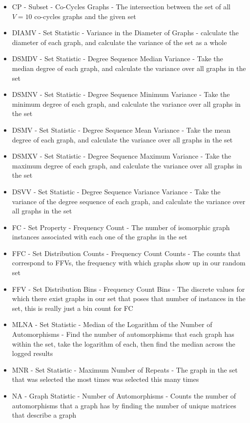 \begin{itemize}
\item{CP - Subset - Co-Cycles Graphs - The intersection between the set of all $V=10$ co-cycles graphs and the given set}
\item{DIAMV - Set Statistic - Variance in the Diameter of Graphs - calculate the diameter of each graph, and calculate the variance of the set as a whole}
\item{DSMDV - Set Statistic - Degree Sequence Median Variance - Take the median degree of each graph, and calculate the variance over all graphs in the set}
\item{DSMNV - Set Statistic - Degree Sequence Minimum Variance - Take the minimum degree of each graph, and calculate the variance over all graphs in the set}
\item{DSMV - Set Statistic - Degree Sequence Mean Variance - Take the mean degree of each graph, and calculate the variance over all graphs in the set}
\item{DSMXV - Set Statistic - Degree Sequence Maximum Variance - Take the maximum degree of each graph, and calculate the variance over all graphs in the set}
\item{DSVV - Set Statistic - Degree Sequence Variance Variance - Take the variance of the degree sequence of each graph, and calculate the variance over all graphs in the set}
\item{FC - Set Property - Frequency Count - The number of isomorphic graph instances associated with each one of the graphs in the set}
\item{FFC - Set Distribution Counts - Frequency Count Counts - The counts that correspond to FFVs, the frequency with which graphs show up in our random set}
\item{FFV - Set Distribution Bins - Frequency Count Bins - The discrete values for which there exist graphs in our set that poses that number of instances in the set, this is really just a bin count for FC}
\item{MLNA - Set Statistic - Median of the Logarithm of the Number of Automorphisms - Find the number of automorphisms that each graph has within the set, take the logarithm of each, then find the median across the logged results}
\item{MNR - Set Statistic - Maximum Number of Repeats - The graph in the set that was selected the most times was selected this many times}
\item{NA - Graph Statistic - Number of Automorphisms - Counts the number of automorphisms that a graph has by finding the number of unique matrices that describe a graph}

\end{itemize}
